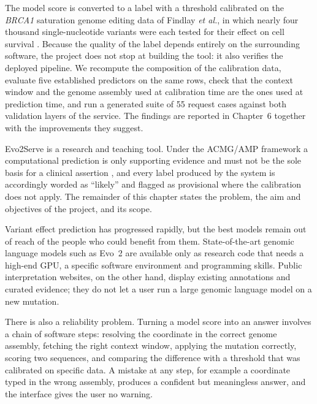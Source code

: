 The model score is converted to a label with a threshold calibrated on the \textit{BRCA1} saturation genome editing data of Findlay \textit{et al.}, in which nearly four thousand single-nucleotide variants were each tested for their effect on cell survival \cite{findlay2018brca1}. Because the quality of the label depends entirely on the surrounding software, the project does not stop at building the tool: it also verifies the deployed pipeline. We recompute the composition of the calibration data, evaluate five established predictors on the same rows, check that the context window and the genome assembly used at calibration time are the ones used at prediction time, and run a generated suite of 55 request cases against both validation layers of the service. The findings are reported in Chapter~6 together with the improvements they suggest.

Evo2Serve is a research and teaching tool. Under the ACMG/AMP framework a computational prediction is only supporting evidence and must not be the sole basis for a clinical assertion \cite{richards2015acmg}, and every label produced by the system is accordingly worded as ``likely'' and flagged as provisional where the calibration does not apply. The remainder of this chapter states the problem, the aim and objectives of the project, and its scope.
\label{ch:1:intro}

\vspace{6pt}
\vspace{8pt}
Variant effect prediction has progressed rapidly, but the best models remain out of reach of the people who could benefit from them. State-of-the-art genomic language models such as Evo~2 are available only as research code that needs a high-end GPU, a specific software environment and programming skills. Public interpretation websites, on the other hand, display existing annotations and curated evidence; they do not let a user run a large genomic language model on a new mutation.

There is also a reliability problem. Turning a model score into an answer involves a chain of software steps: resolving the coordinate in the correct genome assembly, fetching the right context window, applying the mutation correctly, scoring two sequences, and comparing the difference with a threshold that was calibrated on specific data. A mistake at any step, for example a coordinate typed in the wrong assembly, produces a confident but meaningless answer, and the interface gives the user no warning.

